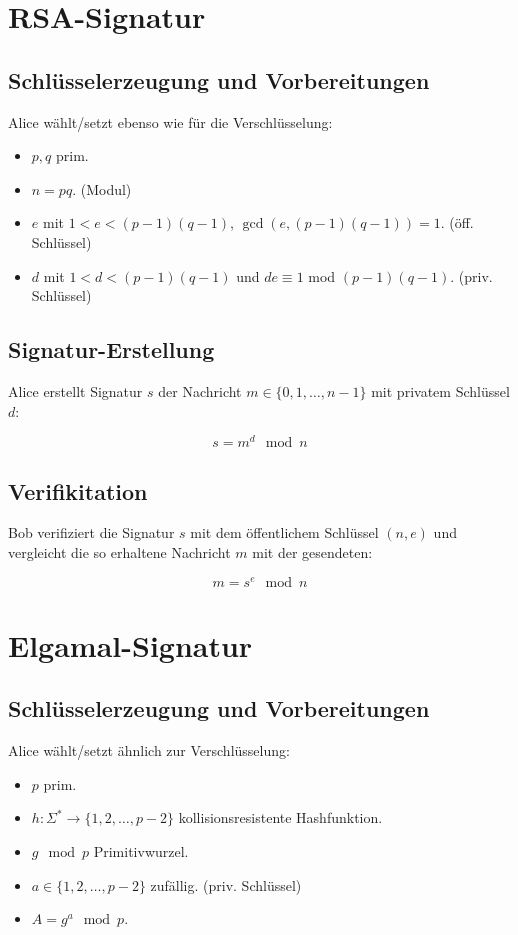 \documentclass[a4paper,12pt,oneside]{scrreprt}
\begin{document}
\section*{RSA-Signatur}

\subsection*{Schlüsselerzeugung und Vorbereitungen}

Alice wählt/setzt ebenso wie für die Verschlüsselung:

\begin{itemize}
 \item $p, q$ prim. 
 \item $n = pq$. (Modul)
 \item $e$ mit $1 < e < (p-1)(q-1)$, $\gcd(e,(p-1)(q-1)) = 1$. (öff. Schlüssel)
 \item $d$ mit $1 < d < (p-1)(q-1)$ und $de \equiv 1$ mod $(p-1)(q-1)$. (priv. Schlüssel)
\end{itemize}


\subsection*{Signatur-Erstellung}

Alice erstellt Signatur $s$ der Nachricht $m \in \{0,1,\dots,n-1\}$ mit privatem Schlüssel $d$: 

\[ s = m^d \mod n \]

\subsection*{Verifikitation}

Bob verifiziert die Signatur $s$ mit dem öffentlichem Schlüssel $(n,e)$ und vergleicht die so erhaltene
Nachricht $m$ mit der gesendeten:

\[ m = s^e \mod n \]


\clearpage
\section*{Elgamal-Signatur}

\subsection*{Schlüsselerzeugung und Vorbereitungen}

Alice wählt/setzt ähnlich zur Verschlüsselung:

\begin{itemize}
 \item $p$ prim. 
 \item $h : \Sigma^* \to \{1,2,\dots,p-2\}$ kollisionsresistente Hashfunktion.
 \item $g \mod p$ Primitivwurzel.
 \item $a \in \{1,2,\dots,p-2\}$ zufällig. (priv. Schlüssel)
 \item $A = g^a \mod p$.
\end{itemize}
\end{document}
